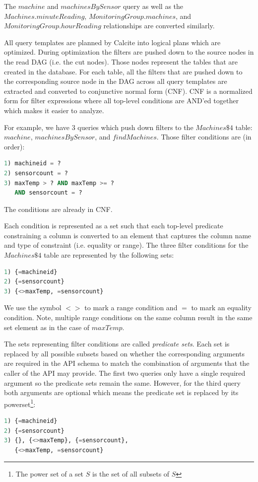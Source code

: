 \documentclass[	DIV=calc,%
							paper=letter,%
							fontsize=11pt,%
							twocolumn]{scrartcl}	 					%
\begin{document}
The $machine$ and $machinesBySensor$ query as well as the $Machines.minuteReading$, $MonitoringGroup.machines$, and $MonitoringGroup.hourReading$ relationships are converted similarly.

All query templates are planned by Calcite into logical plans which are optimized. During optimization the filters are pushed down to the source nodes in the read DAG (i.e. the cut nodes). Those nodes represent the tables that are created in the database. For each table, all the filters that are pushed down to the corresponding source node in the DAG across all query templates are extracted and converted to conjunctive normal form (CNF). CNF is a normalized form for filter expressions where all top-level conditions are AND'ed together which makes it easier to analyze.

For example, we have 3 queries which push down filters to the $Machines\$4$ table: $machine$, $machinesBySensor$, and $findMachines$. Those filter conditions are (in order):
\begin{lstlisting}[language=SQL]
1) machineid = ?
2) sensorcount = ?
3) maxTemp > ? AND maxTemp >= ?
   AND sensorcount = ?
\end{lstlisting}

The conditions are already in CNF.

Each condition is represented as a set such that each top-level predicate constraining a column is converted to an element that captures the column name and type of constraint (i.e. equality or range). The three filter conditions for the $Machines\$4$ table are represented by the following sets:
\begin{lstlisting}[language=SQL]
1) {=machineid}
2) {=sensorcount}
3) {<>maxTemp, =sensorcount}
\end{lstlisting}

We use the symbol $<>$ to mark a range condition and $=$ to mark an equality condition. Note, multiple range conditions on the same column result in the same set element as in the case of $maxTemp$.

The sets representing filter conditions are called \emph{predicate sets}. Each set is replaced by all possible subsets based on whether the corresponding arguments are required in the API schema to match the combination of arguments that the caller of the API may provide. The first two queries only have a single required argument so the predicate sets remain the same. However, for the third query both arguments are optional which means the predicate set is replaced by its powerset\footnote{The power set of a set $S$ is the set of all subsets of $S$}:
\begin{lstlisting}[language=SQL]
1) {=machineid}
2) {=sensorcount}
3) {}, {<>maxTemp}, {=sensorcount},
   {<>maxTemp, =sensorcount}
\end{lstlisting}
\end{document}
